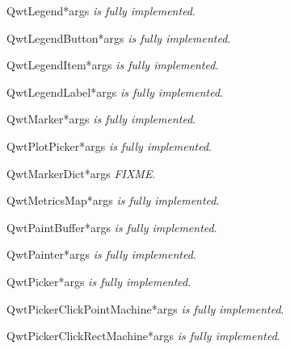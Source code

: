 \documentclass{manual}
\begin{document}
\begin{classdesc}{QwtLegend}{*args}
\emph{is fully implemented}.
\end{classdesc}

\begin{classdesc}{QwtLegendButton}{*args}
\emph{is fully implemented}.
\end{classdesc}

\begin{classdesc}{QwtLegendItem}{*args}
\emph{is fully implemented}.
\end{classdesc}

\begin{classdesc}{QwtLegendLabel}{*args}
\emph{is fully implemented}.
\end{classdesc}

\begin{classdesc}{QwtMarker}{*args}
\emph{is fully implemented}.
\end{classdesc}

\begin{classdesc}{QwtPlotPicker}{*args}
\emph{is fully implemented}.
\end{classdesc}

\begin{classdesc}{QwtMarkerDict}{*args}
\emph{FIXME}.
\end{classdesc}

\begin{classdesc}{QwtMetricsMap}{*args}
\emph{is fully implemented}.
\end{classdesc}

\begin{classdesc}{QwtPaintBuffer}{*args}
\emph{is fully implemented}.
\end{classdesc}

\begin{classdesc}{QwtPainter}{*args}
\emph{is fully implemented}.
\end{classdesc}

\begin{classdesc}{QwtPicker}{*args}
\emph{is fully implemented}.
\end{classdesc}

\begin{classdesc}{QwtPickerClickPointMachine}{*args}
\emph{is fully implemented}.
\end{classdesc}

\begin{classdesc}{QwtPickerClickRectMachine}{*args}
\emph{is fully implemented}.
\end{classdesc}
\end{document}
